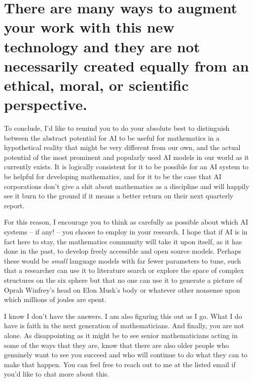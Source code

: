 \documentclass[11pt,reqno]{amsart}
\theoremstyle{plain}
\theoremstyle{definition}
\numberwithin{equation}{section}
\numberwithin{theorem}{section}
\begin{document}
\section{There are many ways to augment your work with this new technology and they are not necessarily created equally from an ethical, moral, or scientific perspective. 
}

To conclude, I’d like to remind you to do your absolute best to distinguish between the abstract potential for AI to be useful for mathematics in a hypothetical reality that might be very different from our own, and the actual potential of the most prominent and popularly used AI models in our world as it currently exists. It is logically consistent for it to be possible for an AI system to be helpful for developing mathematics, and for it to be the case that AI corporations don’t give a shit about mathematics as a discipline and will happily see it burn to the ground if it means a better return on their next quarterly report. 



For this reason, I encourage you to think as carefully as possible about which AI systems – if any! – you choose to employ in your research. I hope that if AI is in fact here to stay, the mathematics community will take it upon itself, as it has done in the past, to develop freely accessible and open source models. Perhaps these would be \textit{small} language models with far fewer parameters to tune, such that a researcher can use it to literature search or explore the space of complex structures on the six sphere but that no one can use it to generate a picture of Oprah Winfrey’s head on Elon Musk’s body or whatever other nonsense upon which millions of joules are spent.


I know I don’t have the answers. I am also figuring this out as I go. What I do have is faith in the next generation of mathematicians. And finally, you are not alone. As disappointing as it might be to see senior mathematicians acting in some of the ways that they are, know that there are also older people who genuinely want to see you succeed and who will continue to do what they can to make that happen. You can feel free to reach out to me at the listed email if you’d like to chat more about this.  




\end{document}
